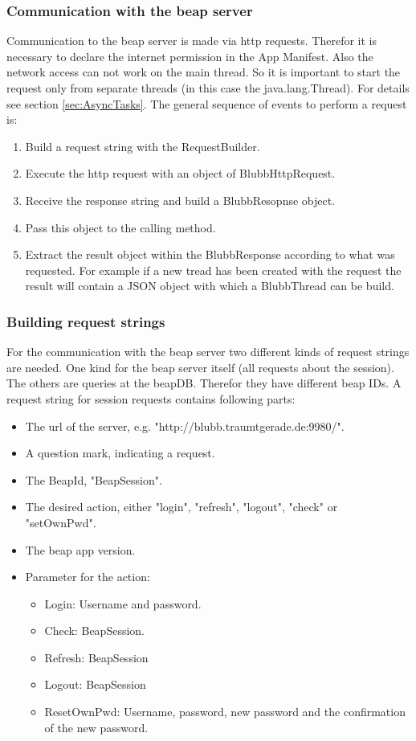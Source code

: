\documentclass[12pt,a4paper,oneside]{report}
\newcommand{\beapDB}{beapDB}
\newcommand{\beapServer}{beap server}
\begin{document}
\subsubsection{Communication with the \beapServer{}}
Communication to the \beapServer{} is made via http requests. Therefor it is necessary to declare the internet permission in the App Manifest. Also the network access can not work on the main thread. So it is important to start the request only from separate threads (in this case the java.lang.Thread). For details see section \ref{sec:AsyncTasks}.
The general sequence of events to perform a request is:
\begin{enumerate}
\item  Build a request string with the RequestBuilder.
\item Execute the http request with an object of BlubbHttpRequest.
\item Receive the response string and build a BlubbResopnse object.
\item Pass this object to the calling method.
\item Extract the result object within the BlubbResponse according to what was requested. For example if a new tread has been created with the request the result will contain a JSON object with which a BlubbThread can be build.
\end{enumerate}

\subsubsection{Building request strings}
For the communication with the \beapServer{} two different kinds of request strings are needed. One kind for the \beapServer{} itself (all requests about the session). The others are queries at the \beapDB{}. Therefor they have different beap IDs.
A request string for session requests contains following parts:
\begin{itemize}
\item The url of the server, e.g. "http://blubb.traumtgerade.de:9980/".
\item A question mark, indicating a request.
\item The BeapId, "BeapSession".
\item The desired action, either "login", "refresh", "logout", "check" or "setOwnPwd".
\item The beap app version.
\item Parameter for the action: 
	\begin{itemize}
	\item Login: Username and password.
 	\item Check: BeapSession.
 	\item Refresh: BeapSession
 	\item Logout: BeapSession
 	\item ResetOwnPwd: Username, password, new password and the confirmation of the new password.
	\end{itemize}
 		
\end{itemize}
\end{document}
